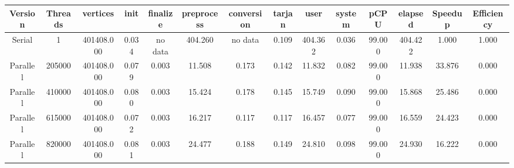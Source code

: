 \begin{tabular}{|c|c|c|c|c|c|c|c|c|c|c|c|c|c|}
\toprule
 Version &  Threads &   vertices &  init & finalize &  preprocess & conversion &  tarjan &    user &  system &   pCPU &  elapsed &  Speedup &  Efficiency \\
\midrule
  Serial &        1 & 401408.000 & 0.034 &  no data &     404.260 &    no data &   0.109 & 404.362 &   0.036 & 99.000 &  404.422 &    1.000 &       1.000 \\
Parallel &   205000 & 401408.000 & 0.079 &    0.003 &      11.508 &      0.173 &   0.142 &  11.832 &   0.082 & 99.000 &   11.938 &   33.876 &       0.000 \\
Parallel &   410000 & 401408.000 & 0.080 &    0.003 &      15.424 &      0.178 &   0.145 &  15.749 &   0.090 & 99.000 &   15.868 &   25.486 &       0.000 \\
Parallel &   615000 & 401408.000 & 0.072 &    0.003 &      16.217 &      0.117 &   0.117 &  16.457 &   0.077 & 99.000 &   16.559 &   24.423 &       0.000 \\
Parallel &   820000 & 401408.000 & 0.081 &    0.003 &      24.477 &      0.188 &   0.149 &  24.810 &   0.098 & 99.000 &   24.930 &   16.222 &       0.000 \\
\bottomrule
\end{tabular}

